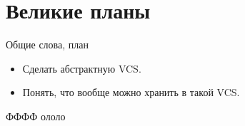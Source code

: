 \section{Великие планы}

\begin{frame}{Общие слова, план}
  \begin{itemize}
  \item Сделать абстрактную VCS.
  \item Понять, что вообще можно хранить в такой VCS.
  \end{itemize}
\end{frame}

%
\begin{frame}{ФФФФ}
    ололо
    \begin{figure}
    \end{figure}
\end{frame}
